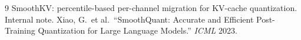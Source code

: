 \documentclass[11pt]{article}
\begin{document}

\begin{thebibliography}{9}
SmoothKV: percentile-based per-channel migration for KV-cache quantization. Internal note.
Xiao, G.\ et al.\ ``SmoothQuant: Accurate and Efficient Post-Training Quantization for Large Language Models.'' \emph{ICML} 2023.
\end{thebibliography}
\end{document}
